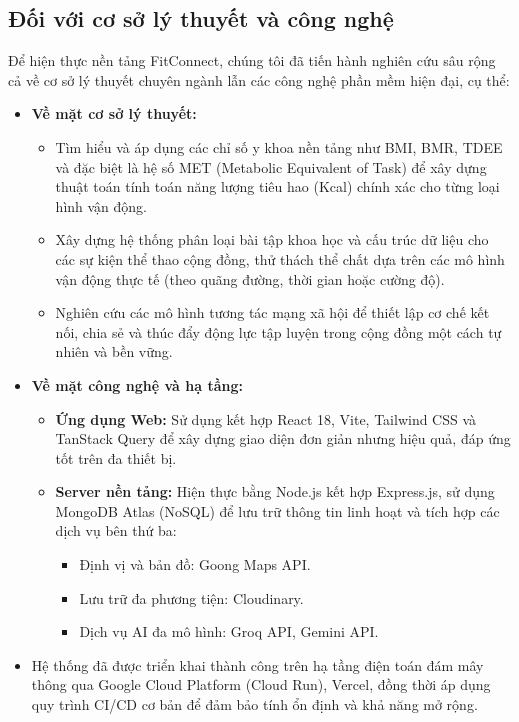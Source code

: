 \subsection{Đối với cơ sở lý thuyết và công nghệ}
Để hiện thực nền tảng FitConnect, chúng tôi đã tiến hành nghiên cứu sâu rộng cả về cơ sở lý thuyết chuyên ngành lẫn các công nghệ phần mềm hiện đại, cụ thể:
\begin{itemize}
    \item \textbf{Về mặt cơ sở lý thuyết:}
    \begin{itemize}
        \item Tìm hiểu và áp dụng các chỉ số y khoa nền tảng như BMI, BMR, TDEE và đặc biệt là hệ số MET (Metabolic Equivalent of Task) để xây dựng thuật toán tính toán năng lượng tiêu hao (Kcal) chính xác cho từng loại hình vận động.
        \item Xây dựng hệ thống phân loại bài tập khoa học và cấu trúc dữ liệu cho các sự kiện thể thao cộng đồng, thử thách thể chất dựa trên các mô hình vận động thực tế (theo quãng đường, thời gian hoặc cường độ).
        \item Nghiên cứu các mô hình tương tác mạng xã hội để thiết lập cơ chế kết nối, chia sẻ và thúc đẩy động lực tập luyện trong cộng đồng một cách tự nhiên và bền vững.
    \end{itemize}
    \item \textbf{Về mặt công nghệ và hạ tầng:}
    \begin{itemize}
        \item \textbf{Ứng dụng Web:} Sử dụng kết hợp React 18, Vite, Tailwind CSS và TanStack Query để xây dựng giao diện đơn giản nhưng hiệu quả, đáp ứng tốt trên đa thiết bị.
        \item \textbf{Server nền tảng:} Hiện thực bằng Node.js kết hợp Express.js, sử dụng MongoDB Atlas (NoSQL) để lưu trữ thông tin linh hoạt và tích hợp các dịch vụ bên thứ ba:
        \begin{itemize}
            \item Định vị và bản đồ: Goong Maps API.
            \item Lưu trữ đa phương tiện: Cloudinary.
            \item Dịch vụ AI đa mô hình: Groq API, Gemini API.
        \end{itemize}
    \end{itemize}
    \item Hệ thống đã được triển khai thành công trên hạ tầng điện toán đám mây thông qua Google Cloud Platform (Cloud Run), Vercel, đồng thời áp dụng quy trình CI/CD cơ bản để đảm bảo tính ổn định và khả năng mở rộng.
\end{itemize}

